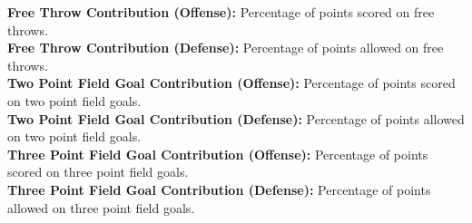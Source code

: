 \documentclass[letterpaper,12pt]{article}
\begin{document}
\textbf{Free Throw Contribution (Offense):} Percentage of points scored on free throws.\\
\textbf{Free Throw Contribution (Defense):} Percentage of points allowed on free throws.\\
\textbf{Two Point Field Goal Contribution (Offense):} Percentage of points scored on two point field goals.\\
\textbf{Two Point Field Goal Contribution (Defense):} Percentage of points allowed on two point field goals.\\
\textbf{Three Point Field Goal Contribution (Offense):} Percentage of points scored on three point field goals.\\
\textbf{Three Point Field Goal Contribution (Defense):} Percentage of points allowed on three point field goals.\\








\end{document}
